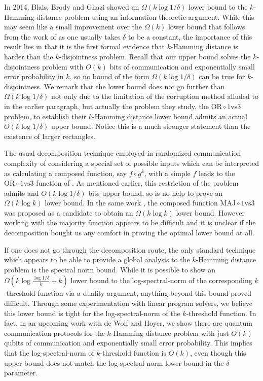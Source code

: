 In 2014, Blais, Brody and Ghazi \cite{BlaisBG2014} showed an 
$\Omega(k\log 1/\delta)$ lower bound to the $k$-Hamming distance problem 
using an information theoretic argument. While this may seem like a 
small improvement over the $\Omega(k)$ lower bound that follows from the 
work of \cite{KalyanasundaramS1992} as one usually takes $\delta$ to be a constant, 
the importance of this result lies in that it is the first formal evidence that 
$k$-Hamming distance is harder than the $k$-disjointness problem. 
Recall that our upper bound \cite{SaglamT2013} solves the $k$-disjointness problem 
with $O(k)$ bits of communication and exponentially small error probability in $k$, 
so no bound of the form $\Omega(k\log 1/\delta)$ can be true for $k$-disjointness. 
We remark that the lower bound \cite{BlaisBG2014} does not go further than $\Omega(k\log 1/\delta)$ 
not only due to the limitation of the corruption method alluded to in the earlier paragraph, 
but actually the problem they study, the $\mathrm{OR}\circ\mathrm{1vs3}$ problem, to establish their $k$-Hamming distance lower bound
admits an actual $O(k \log 1/\delta)$ upper bound. Notice this is a much stronger statement than the existence of larger rectangles.

The usual decomposition technique employed in randomized communication complexity of 
considering a special set of possible inputs which can be interpreted as calculating a 
composed function, say $f\circ g^k$, with a simple $f$ leads to the $\mathrm{OR}\circ\mathrm{1vs3}$
function of \cite{BlaisBG2014}. As mentioned earlier, this restriction of the problem admits
and $O(k\log 1/\delta)$ bits upper bound, so is no help to prove an $\Omega(k\log k)$ lower bound.
In the same work \cite{BlaisBG2014}, the composed function 
$\mathrm{MAJ}\circ\mathrm{1vs3}$ was proposed as a candidate to obtain an $\Omega(k\log k)$ lower bound.
However working with the majority function appears to be difficult and it is unclear if the decomposition
bought us any comfort in proving the optimal lower bound at all.

If one does not go through the decomposition route, the only standard technique 
which appears to be able to provide a global analysis to the $k$-Hamming distance problem is the spectral norm bound.
While it is possible to show an $\Omega(k\log\frac{\log1/\delta}{k} + k)$ lower bound to the log-spectral-norm
of the corresponding $k$-threshold function via a duality argument,  anything beyond this bound proved difficult.
Through some experimentation with linear program solvers, we believe this lower bound is tight for the log-spectral-norm of the $k$-threshold function.
In fact, in an upcoming work with de Wolf and Hoyer, we show there are quantum communication protocols for the $k$-Hamming distance problem
with just $O(k)$ qubits of communication and exponentially small error probability. This implies that the log-spectral-norm of $k$-threshold function is $O(k)$, even though this upper bound does not match the log-spectral-norm lower bound in the $\delta$ parameter. 

